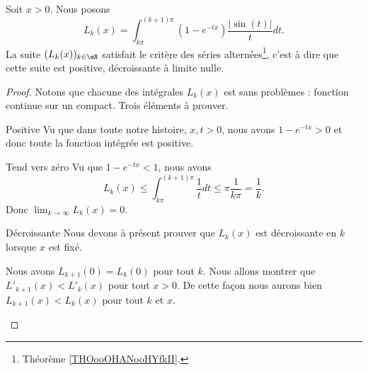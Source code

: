 \begin{lemma}
    Soit \( x>0\). Nous posons
    \begin{equation}
        L_k(x)=\int_{k\pi}^{(k+1)\pi}(1- e^{-tx})\frac{ | \sin(t) | }{ t }dt.
    \end{equation}
    La suite \( (L_k(x))_{k\in \eN}\) satisfait le critère des séries alternées\footnote{Théorème \ref{THOooOHANooHYfkII}.}, c'est à dire que cette suite est positive, décroissante à limite nulle.
\end{lemma}

\begin{proof}
    Notons que chacune des intégrales \( L_k(x)\) est sans problèmes : fonction continue sur un compact. Trois éléments à prouver.
    \begin{subproof}
        \item[Positive]
            Vu que dans toute notre histoire, \( x,t>0\), nous avons \( 1- e^{-tx}>0\) et donc toute la fonction intégrée est positive.
        \item[Tend vers zéro]
            Vu que \( 1- e^{-tx}<1\), nous avons
            \begin{equation}
                L_k(x)\leq \int_{k\pi}^{(k+1)\pi}\frac{1}{ t }dt\leq \pi\frac{1}{ k\pi }=\frac{1}{ k }.
            \end{equation}
            Donc \( \lim_{k\to \infty} L_k(x)=0\).
        \item[Décroissante]
            Nous devons à présent prouver que \( L_k(x)\) est décroissante en \( k\) lorsque \( x\) est fixé.

            Nous avons \( L_{k+1}(0)=L_k(0)\) pour tout \( k\). Nous allons montrer que \( L'_{k+1}(x)<L'_k(x)\) pour tout \( x>0\). De cette façon nous aurons bien \( L_{k+1}(x)<L_k(x)\) pour tout \( k\) et \( x\).


\end{subproof}
\end{proof}
